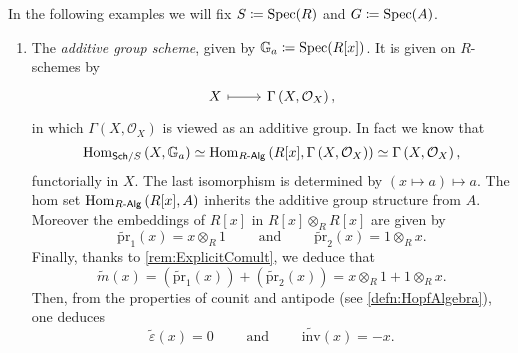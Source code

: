 \begin{ex}\label{ex:AffineGroupSchemesExamples}
	In the following examples we will fix $S \coloneqq \operatorname{Spec}(R)$
	and $G \coloneqq \operatorname{Spec}(A)$.\nopagebreak[4]
	\begin{enumerate}
		\item \label{ex:AdditiveGroupScheme}
		The \emph{additive group scheme}, given by 
			$\mathbb{G}_a \coloneqq \operatorname{Spec}(R[x])$.
			It is given on $R$-schemes by
			\begin{equation*}
			\begin{tikzcd}[row sep = 0ex
				,/tikz/column 1/.append style={anchor=base east}
				,/tikz/column 2/.append style={anchor=base west}]
				X \arrow[r, "", mapsto] & 
				\Gamma \left( X , \mathcal{O}_{ X } \right)
			,\end{tikzcd}
			\end{equation*} 
			in which $\Gamma \left( X , \mathcal{O}_{ X } \right)$ is viewed
			as an additive group.
			In fact	we know that
			\begin{equation*}
			\operatorname{Hom}_{\mathsf{Sch}/S} \left( X, \mathbb{G}_a \right) \simeq
			\operatorname{Hom}_{R \text{-}\mathsf{Alg}} 
			\left( R[x], \Gamma \left( X , \mathcal{O}_{ X } \right) \right) \simeq
			\Gamma \left( X , \mathcal{O}_{ X } \right)
			,\end{equation*} 
			functorially in $X$.
			The last isomorphism is determined by 
			$(x \mapsto a) \mapsto a$.
			The hom set 
			$\operatorname{Hom}_{R \text{-}\mathsf{Alg}} \left( R[x], A \right)$
			inherits the additive group structure from $A$.
			Moreover the embeddings
			of $R[x]$ in $R[x] \otimes_R R[x]$ are given by
			\begin{equation*}
				\widetilde{\mathrm{pr}}_1(x) = x \otimes_R 1
				\qquad \text{ and } \qquad
				\widetilde{\mathrm{pr}}_2(x) = 1 \otimes_R x
			.\end{equation*} 
			Finally, thanks to \cref{rem:ExplicitComult},
			we deduce that
			\begin{equation*}
				\widetilde{m}(x) =
				\left( \widetilde{\mathrm{pr}}_1(x) \right) +
				\left( \widetilde{\mathrm{pr}}_2(x) \right) =
				x \otimes_R 1 + 1 \otimes_R x
			.\end{equation*} 
			Then, from the properties of counit and antipode
			(see \cref{defn:HopfAlgebra}), one deduces 
			\begin{equation*}
				\widetilde{\varepsilon}(x) = 0
				\qquad \text{ and } \qquad
				\widetilde{\mathrm{inv}}(x) = -x
			.\end{equation*} 



\end{enumerate}
\end{ex}
